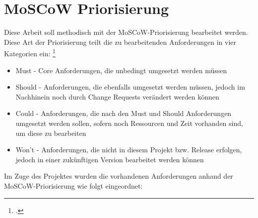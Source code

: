 \documentclass[12pt, a4paper]{report}
\begin{document}
\section{MoSCoW Priorisierung}
Diese Arbeit soll methodisch mit der MoSCoW-Priorisierung bearbeitet werden. Diese Art der Priorisierung teilt die zu bearbeitenden Anforderungen in vier Kategorien ein:
\footcite[vgl.][90]{Projektmanagement}
\begin{itemize}
\item Must - Core Anforderungen, die unbedingt umgesetzt werden müssen
\item Should - Anforderungen, die ebenfalls umgesetzt werden müssen, jedoch im Nachhinein noch durch Change Requests verändert werden können
\item Could - Anforderungen, die nach den Must und Should Anforderungen umgesetzt werden sollen, sofern noch Ressourcen und Zeit vorhanden sind, um diese zu bearbeiten
\item Won't - Anforderungen, die nicht in diesem Projekt bzw. Release erfolgen, jedoch in einer zukünftigen Version bearbeitet werden können 
\end{itemize}
Im Zuge des Projektes wurden die vorhandenen Anforderungen anhand der MoSCoW-Priorisierung wie folgt eingeordnet:
\end{document}

